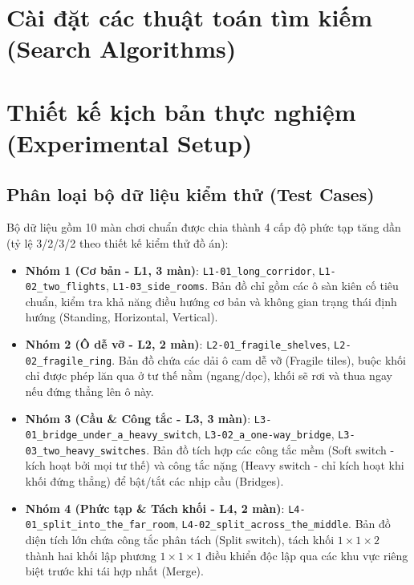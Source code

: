 \documentclass[12pt,a4paper]{article}
\begin{document}
\section{Cài đặt các thuật toán tìm kiếm (Search Algorithms)}









\section{Thiết kế kịch bản thực nghiệm (Experimental Setup)}

\subsection{Phân loại bộ dữ liệu kiểm thử (Test Cases)}
Bộ dữ liệu gồm 10 màn chơi chuẩn được chia thành 4 cấp độ phức tạp tăng dần (tỷ lệ 3/2/3/2 theo thiết kế kiểm thử đồ án):
\begin{itemize}
    \item \textbf{Nhóm 1 (Cơ bản - L1, 3 màn)}: \texttt{L1-01\_long\_corridor}, \texttt{L1-02\_two\_flights}, \texttt{L1-03\_side\_rooms}. Bản đồ chỉ gồm các ô sàn kiên cố tiêu chuẩn, kiểm tra khả năng điều hướng cơ bản và không gian trạng thái định hướng (Standing, Horizontal, Vertical).
    \item \textbf{Nhóm 2 (Ô dễ vỡ - L2, 2 màn)}: \texttt{L2-01\_fragile\_shelves}, \texttt{L2-02\_fragile\_ring}. Bản đồ chứa các dải ô cam dễ vỡ (Fragile tiles), buộc khối chỉ được phép lăn qua ở tư thế nằm (ngang/dọc), khối sẽ rơi và thua ngay nếu đứng thẳng lên ô này.
    \item \textbf{Nhóm 3 (Cầu \& Công tắc - L3, 3 màn)}: \texttt{L3-01\_bridge\_under\_a\_heavy\_switch}, \texttt{L3-02\_a\_one-way\_bridge}, \texttt{L3-03\_two\_heavy\_switches}. Bản đồ tích hợp các công tắc mềm (Soft switch - kích hoạt bởi mọi tư thế) và công tắc nặng (Heavy switch - chỉ kích hoạt khi khối đứng thẳng) để bật/tắt các nhịp cầu (Bridges).
    \item \textbf{Nhóm 4 (Phức tạp \& Tách khối - L4, 2 màn)}: \texttt{L4-01\_split\_into\_the\_far\_room}, \texttt{L4-02\_split\_across\_the\_middle}. Bản đồ diện tích lớn chứa công tắc phân tách (Split switch), tách khối $1 \times 1 \times 2$ thành hai khối lập phương $1 \times 1 \times 1$ điều khiển độc lập qua các khu vực riêng biệt trước khi tái hợp nhất (Merge).
\end{itemize}
\end{document}
